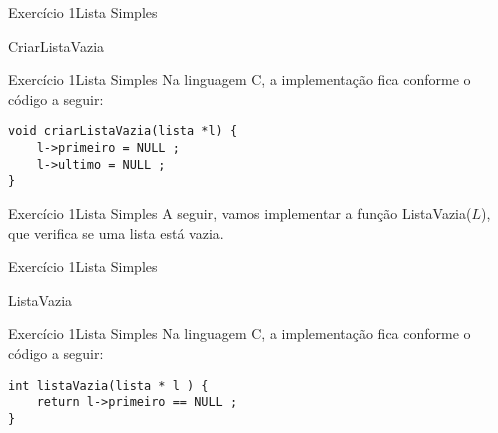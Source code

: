 \documentclass[aspectratio=169]{beamer}
\begin{document}

\begin{frame}[fragile]{Exercício 1}{Lista Simples}
\begin{algorithm}[H]
\caption{CriarListaVazia} 
\label{CriarListaVazia}
\end{algorithm}
\end{frame}


\begin{frame}[fragile]{Exercício 1}{Lista Simples}
Na linguagem C, a implementação fica conforme o código a seguir:
\begin{lstlisting}[style=CStyle]
void criarListaVazia(lista *l) {
    l->primeiro = NULL ;
    l->ultimo = NULL ;
}
\end{lstlisting}  
\end{frame}



\begin{frame}[fragile]{Exercício 1}{Lista Simples}
A seguir, vamos implementar a função ListaVazia($L$), que verifica se uma lista está vazia.
\end{frame}


\begin{frame}[fragile]{Exercício 1}{Lista Simples}
\begin{algorithm}[H]
\caption{ListaVazia} 
\label{ListaVazia}
\end{algorithm}
\end{frame}


\begin{frame}[fragile]{Exercício 1}{Lista Simples}
Na linguagem C, a implementação fica conforme o código a seguir:
\begin{lstlisting}[style=CStyle]
int listaVazia(lista * l ) {
    return l->primeiro == NULL ;
}
\end{lstlisting}  
\end{frame}
\end{document}
